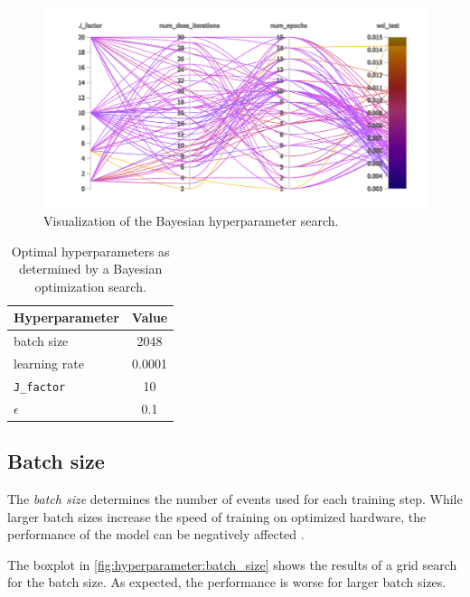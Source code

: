\begin{figure}
  \centering
  \includegraphics[width=\textwidth]{content/plots/halftime/sweep2.png}
  \caption{Visualization of the Bayesian hyperparameter search.}
  \label{fig:hyperparameter:bayesian}
\end{figure}

\begin{table}
    \centering
    \caption{
      Optimal hyperparameters as determined by a Bayesian optimization search.
    }
    \label{tab:hyperparameters:initial}
    \begin{tabular}{l S}
        \toprule
        Hyperparameter & {Value} \\
        \midrule
        batch size & 2048 \\
        learning rate & 0.0001 \\
        \texttt{J\_factor} & 10 \\
        $\epsilon$ & 0.1 \\
        \bottomrule
    \end{tabular}
\end{table}


\subsection{Batch size}
The \emph{batch size} determines the number of events used for each training step.
While larger batch sizes increase the speed of training
on optimized hardware,
the performance of the model can be negatively affected \cite{batchsize_kandel}.

The boxplot in \autoref{fig:hyperparameter:batch_size} shows the results of a grid search for the batch size.
As expected, the performance is worse for larger batch sizes.

